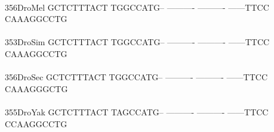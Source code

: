\documentclass[11pt,twoside,reqno,a4paper]{article}
\begin{document}
{\\
356\hspace*{1\charwidth}DroMel	GCTCTTTACT	TGGCCATG--	----------	----------	------TTCC	CAAAGGCCTG	\\
\hspace*{4\charwidth}\hspace*{7\charwidth}\hspace*{1\charwidth}\hspace*{1\charwidth}\hspace*{1\charwidth}\hspace*{1\charwidth}\hspace*{1\charwidth}\hspace*{1\charwidth}\\
353\hspace*{1\charwidth}DroSim	GCTCTTTACT	TGGCCATG--	----------	----------	------TTCC	CAAAGGCCTG	\\
\hspace*{4\charwidth}\hspace*{7\charwidth}\hspace*{1\charwidth}\hspace*{1\charwidth}\hspace*{1\charwidth}\hspace*{1\charwidth}\hspace*{1\charwidth}\hspace*{1\charwidth}\\
356\hspace*{1\charwidth}DroSec	GCTCTTTACT	TGGCCATG--	----------	----------	------TTCC	CAAAGGGCTG	\\
\hspace*{4\charwidth}\hspace*{7\charwidth}\hspace*{1\charwidth}\hspace*{1\charwidth}\hspace*{1\charwidth}\hspace*{1\charwidth}\hspace*{1\charwidth}\hspace*{1\charwidth}\\
355\hspace*{1\charwidth}DroYak	GCTCTTTACT	TAGCCATG--	----------	----------	------TTCC	CCAAGGCCTG	\\
\hspace*{4\charwidth}\hspace*{7\charwidth}\hspace*{1\charwidth}\hspace*{1\charwidth}\hspace*{1\charwidth}\hspace*{1\charwidth}\hspace*{1\charwidth}\hspace*{1\charwidth}\\
}
\end{document}

